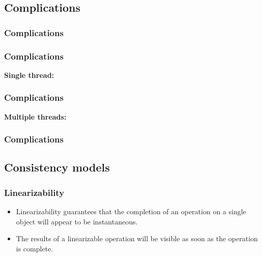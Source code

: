 \documentclass[aspectratio=1610]{beamer}
\begin{document}
  \subsection{Complications}

  \begin{frame}
    \frametitle{Complications}

    \begin{itemize}

      \vfill

    \end{itemize}
  \end{frame}

  \begin{frame}
    \frametitle{Complications}
    \centering

    \textbf{Single thread:}
    \vfill
    \resizebox{0.9\linewidth}{!}{}
  \end{frame}

  \begin{frame}
    \frametitle{Complications}
    \centering

    \textbf{Multiple threads:}
    \vfill
    \resizebox{0.9\linewidth}{!}{}
  \end{frame}

  \begin{frame}
    \frametitle{Complications}

    \centering
    
  \end{frame}

  \subsection{Consistency models}

  \begin{frame}
    \frametitle{Linearizability}

    \begin{figure}
      \centering
      
    \end{figure}

    \vfill

    \begin{itemize}
      \item Linearizability guarantees that the completion of an operation on a single object will appear to be instantaneous.
      \item The results of a linearizable operation will be visible as soon as the operation is complete.
    \end{itemize}
  \end{frame}
\end{document}
